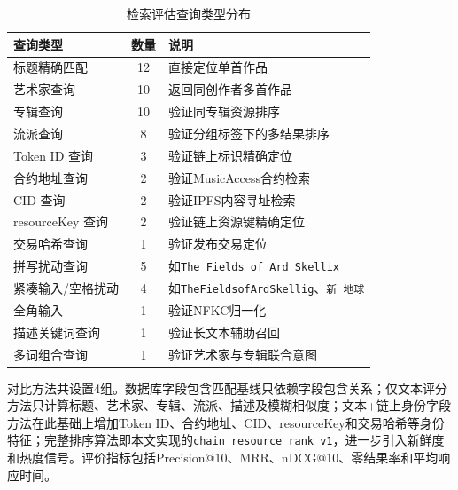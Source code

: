 \begin{table}[htbp]
    \linespread{1.45}
    \songti
    \centering
    \caption{检索评估查询类型分布}\label{tab:ranking_query_categories}
    \begin{tabular}{|l|c|l|}
        \hline
        查询类型           & 数量 & 说明                                            \\ \hline
        标题精确匹配         & 12 & 直接定位单首作品                                      \\ \hline
        艺术家查询          & 10 & 返回同创作者多首作品                                    \\ \hline
        专辑查询           & 10 & 验证同专辑资源排序                                     \\ \hline
        流派查询           & 8  & 验证分组标签下的多结果排序                                 \\ \hline
        Token ID 查询    & 3  & 验证链上标识精确定位                                    \\ \hline
        合约地址查询         & 2  & 验证MusicAccess合约检索                             \\ \hline
        CID 查询         & 2  & 验证IPFS内容寻址检索                                  \\ \hline
        resourceKey 查询 & 2  & 验证链上资源键精确定位                                   \\ \hline
        交易哈希查询         & 1  & 验证发布交易定位                                      \\ \hline
        拼写扰动查询         & 5  & 如\texttt{The Fields of Ard Skellix}           \\ \hline
        紧凑输入/空格扰动      & 4  & 如\texttt{TheFieldsofArdSkellig}、\texttt{新 地球} \\ \hline
        全角输入           & 1  & 验证NFKC归一化                                     \\ \hline
        描述关键词查询        & 1  & 验证长文本辅助召回                                     \\ \hline
        多词组合查询         & 1  & 验证艺术家与专辑联合意图                                  \\ \hline
    \end{tabular}
\end{table}

对比方法共设置4组。数据库字段包含匹配基线只依赖字段包含关系；仅文本评分方法只计算标题、艺术家、专辑、流派、描述及模糊相似度；文本+链上身份字段方法在此基础上增加Token ID、合约地址、CID、resourceKey和交易哈希等身份特征；完整排序算法即本文实现的\texttt{chain\_resource\_rank\_v1}，进一步引入新鲜度和热度信号。评价指标包括Precision@10、MRR、nDCG@10、零结果率和平均响应时间。



